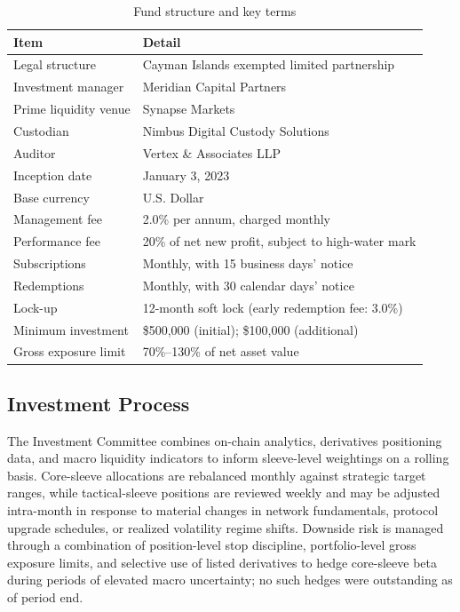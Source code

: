 \begin{table}[H]
\centering
\small
\caption{Fund structure and key terms}
\label{tab:key-terms}
\begin{tabular}{@{}ll@{}}
\toprule
\textbf{Item} & \textbf{Detail} \\
\midrule
Legal structure & Cayman Islands exempted limited partnership \\
Investment manager & Meridian Capital Partners \\
Prime liquidity venue & Synapse Markets \\
Custodian & Nimbus Digital Custody Solutions \\
Auditor & Vertex \& Associates LLP \\
Inception date & January 3, 2023 \\
Base currency & U.S. Dollar \\
Management fee & 2.0\% per annum, charged monthly \\
Performance fee & 20\% of net new profit, subject to high-water mark \\
Subscriptions & Monthly, with 15 business days' notice \\
Redemptions & Monthly, with 30 calendar days' notice \\
Lock-up & 12-month soft lock (early redemption fee: 3.0\%) \\
Minimum investment & \$500,000 (initial); \$100,000 (additional) \\
Gross exposure limit & 70\%--130\% of net asset value \\
\bottomrule
\end{tabular}
\end{table}

\subsection{Investment Process}

The Investment Committee combines on-chain analytics, derivatives positioning data, and macro liquidity indicators to inform sleeve-level weightings on a rolling basis. Core-sleeve allocations are rebalanced monthly against strategic target ranges, while tactical-sleeve positions are reviewed weekly and may be adjusted intra-month in response to material changes in network fundamentals, protocol upgrade schedules, or realized volatility regime shifts. Downside risk is managed through a combination of position-level stop discipline, portfolio-level gross exposure limits, and selective use of listed derivatives to hedge core-sleeve beta during periods of elevated macro uncertainty; no such hedges were outstanding as of period end.
